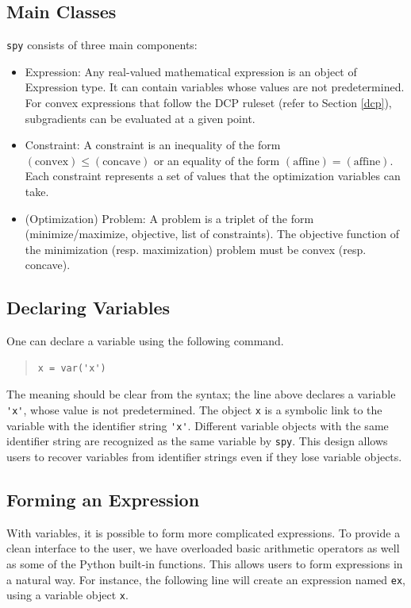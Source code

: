 \documentclass[12pt]{article}
\begin{document}
\subsection{Main Classes}
\verb'spy' consists of three main components:

\begin{itemize}
\item Expression: Any real-valued mathematical expression is an object
of Expression type. It can contain variables whose values are not
predetermined. For convex expressions that follow the DCP ruleset (refer to Section \ref{dcp}), subgradients can be evaluated at a given point.
\item Constraint: A constraint is an inequality of the form
$(\mbox{convex}) \le (\mbox{concave})$ or an equality of the form
$(\mbox{affine}) = (\mbox{affine})$. Each constraint represents a set of values that the optimization variables can take.
\item (Optimization) Problem: A problem is a triplet of the form (minimize/maximize, objective, list of constraints). The objective function of the minimization (resp. maximization) problem must be convex (resp. concave).
\end{itemize}

\subsection{Declaring Variables}
One can declare a variable using the following command.

\begin{quote}
\begin{verbatim}
x = var('x')
\end{verbatim}
\end{quote}

\noindent The meaning should be clear from the syntax; the line above declares a
variable \verb,'x',, whose value is not predetermined. The object \verb'x' is a symbolic link to the variable with the identifier string \verb,'x',. Different variable objects with the same identifier string are recognized as the same variable by \verb'spy'. This design allows users to recover variables from identifier strings even if they lose variable objects.

\subsection{Forming an Expression}
With variables, it is possible to form more complicated expressions. To
provide a clean interface to the user, we have overloaded basic arithmetic operators as
well as some of the Python built-in functions. This allows users to form
expressions in a natural way. For instance, the following line will create an expression named \verb'ex', using a variable object \verb'x'.
\end{document}
